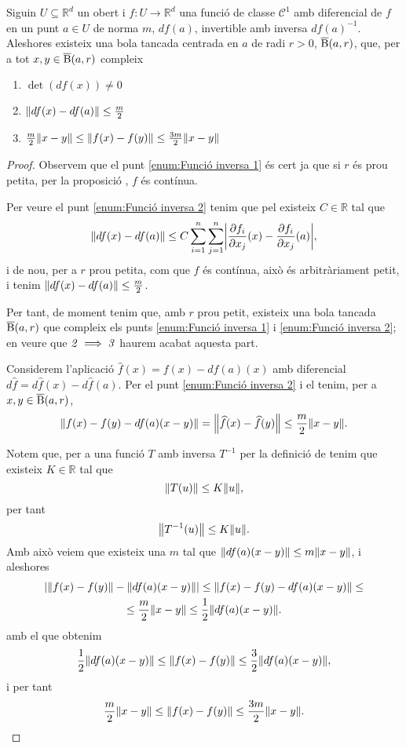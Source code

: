 \documentclass[../Apunts.tex]{subfiles}
\begin{document}
	\begin{lemma}\label{lema:Funció inversa}
		Siguin \(U\subseteq\mathbb{R}^{d}\) un obert i \(f\colon U\to\mathbb{R}^{d}\) una funció de classe \(\mathcal{C}^{1}\) amb diferencial de \(f\) en un punt \(a\in U\) de norma \(m\), \(df(a)\), invertible amb inversa \(df(a)^{-1}\). Aleshores existeix una bola tancada centrada en \(a\) de radi \(r>0\), \(\overline{\operatorname{B}}(a,r)\), que, per a tot \(x,y\in\overline{\operatorname{B}}(a,r)\) compleix
		\begin{enumerate}
			\item\label{enum:Funció inversa 1} \(\det(df(x))\neq0\)
			\item\label{enum:Funció inversa 2} \(\norm{df(x)-df(a)}\leq\frac{m}{2}\)
			\item\label{enum:Funció inversa 3} \(\frac{m}{2}\norm{x-y}\leq\norm{f(x)-f(y)}\leq\frac{3m}{2}\norm{x-y}\)
		\end{enumerate}
		\begin{proof}
			Observem que el punt \eqref{enum:Funció inversa 1} és cert ja que si \(r\) és prou petita, per la proposició , \(f\) és contínua.
			
			Per veure el punt \eqref{enum:Funció inversa 2} tenim que pel  existeix \(C\in\mathbb{R}\) tal que
			\[\norm{df(x)-df(a)}\leq C\sum_{i=1}^{n}\sum_{j=1}^{n}\abs{\frac{\partial f_{i}}{\partial x_{j}}(x)-\frac{\partial f_{i}}{\partial x_{j}}(a)},\]
			i de nou, per a \(r\) prou petita, com que \(f\) és contínua, això és arbitràriament petit, i tenim \(\norm{df(x)-df(a)}\leq\frac{m}{2}\).
			
			Per tant, de moment tenim que, amb \(r\) prou petit, existeix una bola tancada \(\overline{\operatorname{B}}(a,r)\) que compleix els punts \eqref{enum:Funció inversa 1} i \eqref{enum:Funció inversa 2}; en veure que \(\mathit{2}\implies\mathit{3}\) haurem acabat aquesta part.
			
			Considerem l'aplicació \(\widehat{f}(x)=f(x)-df(a)(x)\) amb diferencial \(d\widehat{f}=d\widehat{f}(x)-d\widehat{f}(a)\). Per el punt \eqref{enum:Funció inversa 2} i el  tenim, per a \(x,y\in\overline{\operatorname{B}}(a,r)\), %
			\[\norm{f(x)-f(y)-df(a)(x-y)}=\norm{\widehat{f}(x)-\widehat{f}(y)}\leq\frac{m}{2}\norm{x-y}.\]
			
			Notem que, per a una funció \(T\) amb inversa \(T^{-1}\) per la definició de  tenim que existeix \(K\in\mathbb{R}\) tal que
			\[\norm{T(u)}\leq K\norm{u},\]
			per tant
			\[\norm{T^{-1}(u)}\leq K\norm{u}.\]
			Amb això veiem que existeix una \(m\) tal que \(\norm{df(a)(x-y)}\leq m\norm{x-y}\), i aleshores
			\begin{multline*}
			\abs{\norm{f(x)-f(y)}-\norm{df(a)(x-y)}}\leq\norm{f(x)-f(y)-df(a)(x-y)}\leq\\\leq\frac{m}{2}\norm{x-y}\leq\frac{1}{2}\norm{df(a)(x-y)}.
			\end{multline*}
			amb el que obtenim
			\[\frac{1}{2}\norm{df(a)(x-y)}\leq\norm{f(x)-f(y)}\leq\frac{3}{2}\norm{df(a)(x-y)},\]
			i per tant
			\[\frac{m}{2}\norm{x-y}\leq\norm{f(x)-f(y)}\leq\frac{3m}{2}\norm{x-y}.\qedhere\]
		\end{proof}
	\end{lemma}
\end{document}
